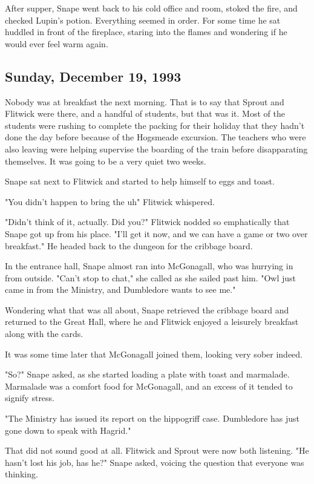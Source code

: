 After supper, Snape went back to his cold office and room, stoked the fire, and checked Lupin's potion. Everything seemed in order. For some time he sat huddled in front of the fireplace, staring into the flames and wondering if he would ever feel warm again.

\subsection{Sunday, December 19, 1993}

Nobody was at breakfast the next morning. That is to say that Sprout and Flitwick were there, and a handful of students, but that was it. Most of the students were rushing to complete the packing for their holiday that they hadn't done the day before because of the Hogsmeade excursion. The teachers who were also leaving were helping supervise the boarding of the train before disapparating themselves. It was going to be a very quiet two weeks.

Snape sat next to Flitwick and started to help himself to eggs and toast.

"You didn't happen to bring the{\el} uh{\el}" Flitwick whispered.

"Didn't think of it, actually. Did you{\el}?" Flitwick nodded so emphatically that Snape got up from his place. "I'll get it now, and we can have a game or two over breakfast." He headed back to the dungeon for the cribbage board.

In the entrance hall, Snape almost ran into McGonagall, who was hurrying in from outside. "Can't stop to chat," she called as she sailed past him. "Owl just came in from the Ministry, and Dumbledore wants to see me."

Wondering what that was all about, Snape retrieved the cribbage board and returned to the Great Hall, where he and Flitwick enjoyed a leisurely breakfast along with the cards.

It was some time later that McGonagall joined them, looking very sober indeed.

"So?" Snape asked, as she started loading a plate with toast and marmalade. Marmalade was a comfort food for McGonagall, and an excess of it tended to signify stress.

"The Ministry has issued its report on the hippogriff case. Dumbledore has just gone down to speak with Hagrid."

That did not sound good at all. Flitwick and Sprout were now both listening. "He hasn't lost his job, has he?" Snape asked, voicing the question that everyone was thinking.

